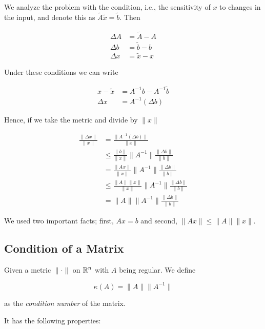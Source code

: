 We analyze the problem with the condition, i.e., the sensitivity of \(x\) to changes in the input, and denote 
this as \(\tilde{A}\tilde{x} = \tilde{b}\). Then 

\begin{align*}
    \Delta A &= \tilde{A} - A \\
    \Delta b &= \tilde{b} - b \\
    \Delta x &= \tilde{x} - x 
\end{align*}

Under these conditions we can write 

\begin{align*}
    x - \tilde{x} &= A^{-1}b - A^{-1}\tilde{b}\\ 
    \Delta x & = A^{-1}(\Delta b)
\end{align*}

Hence, if we take the metric and divide by \(\|x\|\)

\begin{align*} 
    \frac{\|\Delta x\|}{\|x\|} &= \frac{\|A^{-1}(\Delta b)\|}{\|x\|} \\ 
                               &\le \frac{\|b\|}{\|x\|} \|A^{-1}\| \frac{\|\Delta b\|}{\|b\|} \\   
                               &= \frac{\|Ax\|}{\|x\|} \|A^{-1}\| \frac{\|\Delta b\|}{\|b\|} \\ 
                               &\le \frac{\|A\|\|x\|}{\|x\|} \|A^{-1}\| \frac{\|\Delta b\|}{\|b\|} \\ 
                               &= \|A\| \|A^{-1}\| \frac{\|\Delta b\|}{\|b\|}
\end{align*}

We used two important facts; first, \(Ax = b\) and second, \(\|Ax\| \le \|A\|\|x\|\).

\subsection{Condition of a Matrix}

Given a metric \(\|\cdot \|\) on \(\mathbb{R}^n\) with \(A\) being regular. We define 

\[
    \kappa(A) = \|A\|\|A^{-1}\|
\] 

as the \emph{condition number} of the matrix.

It has the following properties: 

